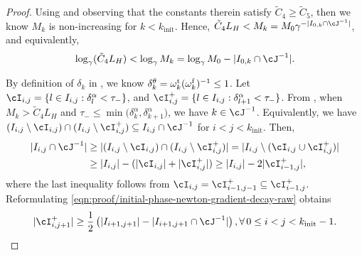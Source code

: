 \begin{proof}
    Using 
    and observing that the constants therein satisfy $\tilde C_4 \geq \tilde C_5$,
    then we know 
    $M_k$ is non-increasing for $k < k_{\mathrm{init}}$.
    Hence, $\tilde C_4 L_H < M_k = M_0 \gamma^{-|I_{0,k} \cap \cJ^{-1}|}$, and equivalently,
    \begin{equation}
        \label{eqn:proof/lipschitz-decay-count}
       \log_\gamma (\tilde C_4L_H) < \log_\gamma M_k = \log_\gamma M_0 - |I_{0,k} \cap \cJ^{-1}|.
    \end{equation}

    By definition of $\delta_k$ in , we know $\delta_k^\theta = \omega_k^{\mathrm{t}} (\omega_k^{\mathrm{f}})^{-1} \leq 1$.
    Let %
    $\cI_{i,j} = \{ l \in I_{i,j} : \delta_l^\alpha < \tau_-\}$,
    and $\cI_{i,j}^+ = \{ l \in I_{i,j} : \delta_{l+1}^\alpha < \tau_- \}$. 
    From , 
    when $M_k > \tilde C_4 L_H$ and $\tau_- \leq \min\big ( \delta_k^\alpha, \delta_{k+1}^\alpha \big )$, 
    we have $k \in \cJ^{-1}$.
    Equivalently, we have $(I_{i,j} \setminus \cI_{i,j}) \cap (I_{i,j} \setminus \cI_{i,j}^+) \subseteq I_{i,j} \cap \cJ^{-1}$ for $i < j < k_{\mathrm{init}}$.
    Then, 
    \begin{align}
        \nonumber
        |I_{i,j} \cap \cJ^{-1} |
        &\geq 
        |(I_{i,j} \setminus \cI_{i,j}) \cap (I_{i,j} \setminus \cI_{i,j}^+)|
        = 
        |I_{i,j} \setminus 
        ( \cI_{i,j}
        \cup  \cI^+_{i,j})| \\
        &\geq 
        |I_{i,j}| -  ( |\cI_{i,j}| +  |\cI^+_{i,j}|) 
        \geq 
        |I_{i,j}| -  2|\cI^+_{i-1,j}|
        ,
        \label{eqn:proof/initial-phase-newton-gradient-decay-raw}
    \end{align}
    where the last inequality follows from $\cI_{i,j} = \cI_{i-1,j-1}^+ \subseteq \cI_{i-1,j}^+$.
    Reformulating \eqref{eqn:proof/initial-phase-newton-gradient-decay-raw} obtains
    \begin{equation}
        |\cI^+_{i,j+1}|\geq \frac{1}{2}\left( |I_{i+1,j+1}| - |I_{i+1,j+1} \cap \cJ^{-1}| \right),  \forall\, 0\leq i < j < k_{\mathrm{init}} - 1.
        \label{eqn:proof/initial-phase-newton-gradient-decay}
    \end{equation}


\end{proof}

